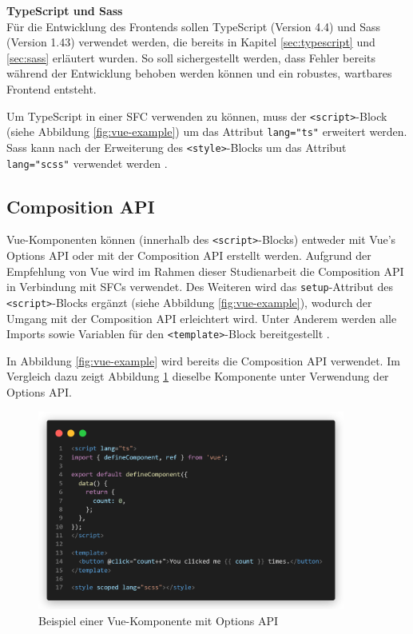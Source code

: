 \textbf{TypeScript und Sass} \\
Für die Entwicklung des Frontends sollen TypeScript (Version 4.4) und Sass (Version 1.43) verwendet werden, die bereits in Kapitel \ref{sec:typescript} und \ref{sec:sass} erläutert wurden. So soll sichergestellt werden, dass Fehler bereits während der Entwicklung behoben werden können und ein robustes, wartbares Frontend entsteht.

Um TypeScript in einer \ac{SFC} verwenden zu können, muss der \lstinline{<script>}-Block (siehe Abbildung \ref{fig:vue-example}) um das Attribut \lstinline{lang="ts"} erweitert werden. Sass kann nach der Erweiterung des \lstinline{<style>}-Blocks um das Attribut \lstinline{lang="scss"} verwendet werden \cite[vgl.][]{VueSFC}.

%
%
\subsection{Composition API}
Vue-Komponenten können (innerhalb des \lstinline{<script>}-Blocks) entweder mit Vue's Options API oder mit der Composition API erstellt werden. Aufgrund der Empfehlung von Vue wird im Rahmen dieser Studienarbeit die Composition API in Verbindung mit \acp{SFC} verwendet. Des Weiteren wird das \lstinline{setup}-Attribut des \lstinline{<script>}-Blocks ergänzt (siehe Abbildung \ref{fig:vue-example}), wodurch der Umgang mit der Composition API erleichtert wird. Unter Anderem werden alle Imports sowie Variablen für den \lstinline{<template>}-Block bereitgestellt \cite[vgl.][]{VueIntroduction}.

In Abbildung \ref{fig:vue-example} wird bereits die Composition API verwendet. Im Vergleich dazu zeigt Abbildung \ref{fig:vue-example-options-api} dieselbe Komponente unter Verwendung der Options API.

\begin{figure}[!htb]
  \includegraphics[width=0.9\textwidth]{images/vue-example-options-api.png}
  \centering
  \caption[Beispiel einer Vue-Komponente mit Options API]{Beispiel einer Vue-Komponente mit Options API \cites[vgl.][]{VueIntroduction}[vgl.][]{VueSFC}}
  \label{fig:vue-example-options-api}
\end{figure}

